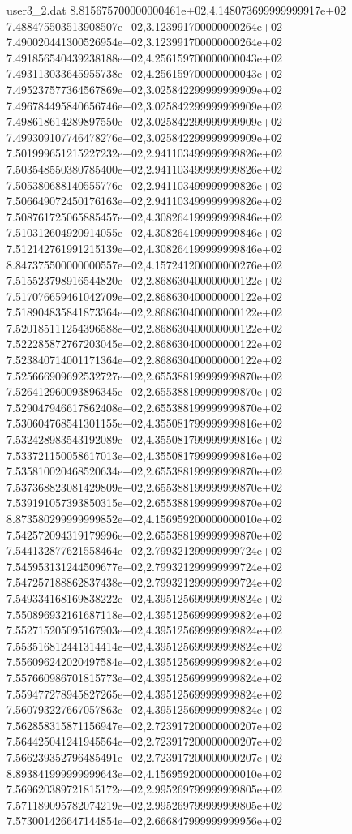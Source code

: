 \begin{filecontents}{user3_2.dat}
8.815675700000000461e+02,4.148073699999999917e+02
7.488475503513908507e+02,3.123991700000000264e+02
7.490020441300526954e+02,3.123991700000000264e+02
7.491856540439238188e+02,4.256159700000000043e+02
7.493113033645955738e+02,4.256159700000000043e+02
7.495237577364567869e+02,3.025842299999999909e+02
7.496784495840656746e+02,3.025842299999999909e+02
7.498618614289897550e+02,3.025842299999999909e+02
7.499309107746478276e+02,3.025842299999999909e+02
7.501999651215227232e+02,2.941103499999999826e+02
7.503548550380785400e+02,2.941103499999999826e+02
7.505380688140555776e+02,2.941103499999999826e+02
7.506649072450176163e+02,2.941103499999999826e+02
7.508761725065885457e+02,4.308264199999999846e+02
7.510312604920914055e+02,4.308264199999999846e+02
7.512142761991215139e+02,4.308264199999999846e+02
8.847375500000000557e+02,4.157241200000000276e+02
7.515523798916544820e+02,2.868630400000000122e+02
7.517076659461042709e+02,2.868630400000000122e+02
7.518904835841873364e+02,2.868630400000000122e+02
7.520185111254396588e+02,2.868630400000000122e+02
7.522285872767203045e+02,2.868630400000000122e+02
7.523840714001171364e+02,2.868630400000000122e+02
7.525666909692532727e+02,2.655388199999999870e+02
7.526412960093896345e+02,2.655388199999999870e+02
7.529047946617862408e+02,2.655388199999999870e+02
7.530604768541301155e+02,4.355081799999999816e+02
7.532428983543192089e+02,4.355081799999999816e+02
7.533721150058617013e+02,4.355081799999999816e+02
7.535810020468520634e+02,2.655388199999999870e+02
7.537368823081429809e+02,2.655388199999999870e+02
7.539191057393850315e+02,2.655388199999999870e+02
8.873580299999999852e+02,4.156959200000000010e+02
7.542572094319179996e+02,2.655388199999999870e+02
7.544132877621558464e+02,2.799321299999999724e+02
7.545953131244509677e+02,2.799321299999999724e+02
7.547257188862837438e+02,2.799321299999999724e+02
7.549334168169838222e+02,4.395125699999999824e+02
7.550896932161687118e+02,4.395125699999999824e+02
7.552715205095167903e+02,4.395125699999999824e+02
7.553516812441314414e+02,4.395125699999999824e+02
7.556096242020497584e+02,4.395125699999999824e+02
7.557660986701815773e+02,4.395125699999999824e+02
7.559477278945827265e+02,4.395125699999999824e+02
7.560793227667057863e+02,4.395125699999999824e+02
7.562858315871156947e+02,2.723917200000000207e+02
7.564425041241945564e+02,2.723917200000000207e+02
7.566239352796485491e+02,2.723917200000000207e+02
8.893841999999999643e+02,4.156959200000000010e+02
7.569620389721815172e+02,2.995269799999999805e+02
7.571189095782074219e+02,2.995269799999999805e+02
7.573001426647144854e+02,2.666847999999999956e+02

\end{filecontents}
